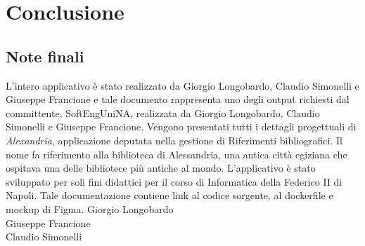 \chapter{Conclusione}
\raggedright{\section{Note finali}}
L'intero applicativo è stato realizzato da Giorgio Longobardo, Claudio Simonelli e Giuseppe Francione e tale documento rappresenta uno degli output richiesti dal committente, SoftEngUniNA, realizzata da Giorgio Longobardo, Claudio Simonelli e Giuseppe Francione. Vengono presentati tutti i dettagli progettuali di \textit{Alexandria}, applicazione deputata nella gestione di Riferimenti bibliografici. Il nome fa riferimento alla biblioteca di Alessandria, una antica città egiziana che ospitava una delle bibliotece più antiche al mondo. L'applicativo è stato sviluppato per soli fini didattici per il corso di Informatica della Federico II di Napoli. Tale documentazione contiene link al codice sorgente, al dockerfile e mockup di Figma.
\hspace{0pt}
\vfill
    \raggedleft Giorgio Longobardo \\ Giuseppe Francione \\ Claudio Simonelli
\vfill
\hspace{0pt}